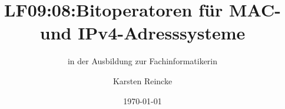 \documentclass[]{beamer}
\title{LF09:08:Bitoperatoren für MAC- und IPv4-Adresssysteme}
\subtitle{in der Ausbildung zur Fachinformatikerin}
\institute[GS-LDK]{Gewerbliche Schulen Dillenburg}
\author{Karsten Reincke}
\date{\today}
\def\cfgGl{../../../cfg.gl/}
\begin{document}

\begin{frame}
  \titlepage

  
\end{frame}






\logo{}
\newpage



%
\end{document}
